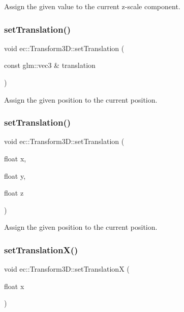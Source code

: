 Assign the given value to the current z-\/scale component. \mbox{\label{classec_1_1_transform3_d_a2866183fe28eb5e5360d156830b00655}} 
\subsubsection{\texorpdfstring{set\+Translation()}{setTranslation()}\hspace{0.1cm}{\footnotesize\ttfamily [1/2]}}
{\footnotesize\ttfamily void ec\+::\+Transform3\+D\+::set\+Translation (\begin{DoxyParamCaption}\item[{const glm\+::vec3 \&}]{translation }\end{DoxyParamCaption})}

Assign the given position to the current position. \mbox{\label{classec_1_1_transform3_d_a2671c96409a11a74d9c7cb96d96b274b}} 
\subsubsection{\texorpdfstring{set\+Translation()}{setTranslation()}\hspace{0.1cm}{\footnotesize\ttfamily [2/2]}}
{\footnotesize\ttfamily void ec\+::\+Transform3\+D\+::set\+Translation (\begin{DoxyParamCaption}\item[{float}]{x,  }\item[{float}]{y,  }\item[{float}]{z }\end{DoxyParamCaption})}

Assign the given position to the current position. \mbox{\label{classec_1_1_transform3_d_a51d65455864ed3595a53c40d2f576067}} 
\subsubsection{\texorpdfstring{set\+Translation\+X()}{setTranslationX()}}
{\footnotesize\ttfamily void ec\+::\+Transform3\+D\+::set\+TranslationX (\begin{DoxyParamCaption}\item[{float}]{x }\end{DoxyParamCaption})}

